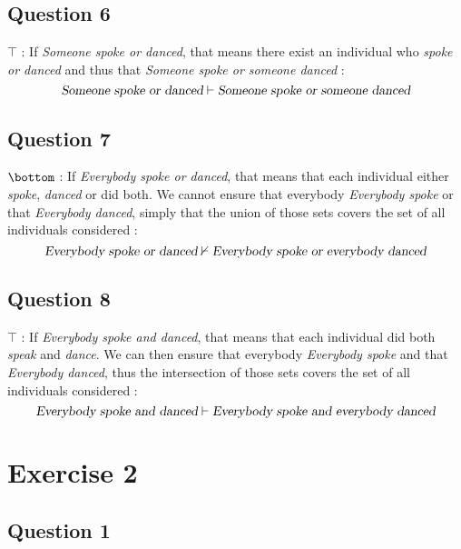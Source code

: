 \documentclass{cours}
\begin{document}
        \subsection{Question 6}
        $\top$ : If \textsl{Someone spoke or danced}, that means there exist an individual who \textsl{spoke or danced} and thus that \textsl{Someone spoke or someone danced} :
        \[
            \textsl{Someone spoke or danced} \vdash \textsl{Someone spoke or someone danced}
        \]  

        \subsection{Question 7}
        $\bottom$ : If \textsl{Everybody spoke or danced}, that means that each individual either \textsl{spoke}, \textsl{danced} or did both. We cannot ensure that everybody \textsl{Everybody spoke} or that \textsl{Everybody danced}, simply that the union of those sets covers the set of all individuals considered : 
        \[
            \textsl{Everybody spoke or danced}  \nvdash \textsl{Everybody spoke or everybody danced}
        \]

        \subsection{Question 8}
        $\top$ : If \textsl{Everybody spoke and danced}, that means that each individual did both \textsl{speak} and \textsl{dance}. We can then ensure that everybody \textsl{Everybody spoke} and that \textsl{Everybody danced}, thus the intersection of those sets covers the set of all individuals considered : 
        \[
            \textsl{Everybody spoke and danced}  \vdash \textsl{Everybody spoke and everybody danced}
        \]

    \section{Exercise 2}
        \subsection{Question 1}
\end{document}
